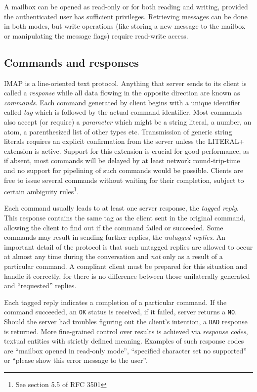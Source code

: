 \documentclass[12pt,notitlepage]{report}
\begin{document}
A mailbox can be opened as read-only or for both reading and writing, provided the
authenticated user has sufficient privileges.  Retrieving messages can be done in
both modes, but write operations (like storing a new message to the mailbox or
manipulating the message flags) require read-write access.

\subsection{Commands and responses}

IMAP is a line-oriented text protocol.  Anything that server sends to its client
is called a {\em response} while all data flowing in the opposite direction are
known as {\em commands}.  Each command generated by client begins with a unique
identifier called {\em tag} which is followed by the actual command identifier.
Most commands also accept (or require) a {\em parameter} which might be a string
literal, a number, an atom, a parenthesized list of other types etc.
Transmission of generic string literals requires an explicit confirmation from
the server unless the LITERAL+ \cite{rfc-literalplus} extension is active.
Support for this extension is crucial for good performance, as if absent, most
commands will be delayed by at least network round-trip-time and no support for
pipelining of such commands would be possible.  Clients are free to issue several
commands without waiting for their completion, subject to certain ambiguity
rules\footnote{See section 5.5 of RFC 3501}.

Each command usually leads to at least one server response, the {\em tagged
reply}.  This response contains the same tag as the client sent in the original
command, allowing the client to find out if the command failed or succeeded.
Some commands may result in sending further replies, the {\em untagged replies}.
An important detail of the protocol is that such untagged replies are allowed to
occur at almost any time during the conversation and {\em not} only as a result
of a particular command.  A compliant client must be prepared for this situation
and handle it correctly, for there is no difference between those unilaterally
generated and ``requested'' replies.

Each tagged reply indicates a completion of a particular command.  If the
command succeeded, an {\tt OK} status is received, if it failed, server returns
a {\tt NO}.  Should the server had troubles figuring out the client's intention,
a {\tt BAD} response is returned.  More fine-grained control over results is
achieved via {\em response codes}, textual entities with strictly defined
meaning.  Examples of such response codes are ``mailbox opened in read-only
mode'', ``specified character set no supported'' or ``please show this error
message to the user''.
\end{document}
